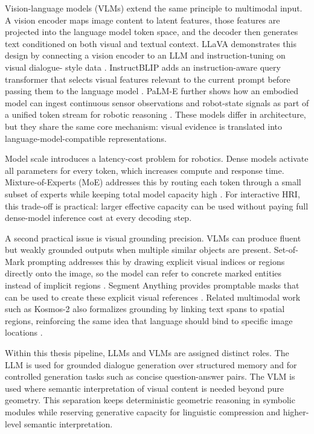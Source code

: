   Vision-language models (VLMs) extend the same principle to multimodal input. A vision encoder maps image content to latent features, those features are projected into the language model token space,
  and the decoder then generates text conditioned on both visual and textual context. LLaVA demonstrates this design by connecting a vision encoder to an LLM and instruction-tuning on visual dialogue-
  style data \cite{liu_visual_2023}. InstructBLIP adds an instruction-aware query transformer that selects visual features relevant to the current prompt before passing them to the language model
  \cite{dai_instructblip_2023}. PaLM-E further shows how an embodied model can ingest continuous sensor observations and robot-state signals as part of a unified token stream for robotic reasoning
  \cite{driess_palm-e_2023}. These models differ in architecture, but they share the same core mechanism: visual evidence is translated into language-model-compatible representations.

  Model scale introduces a latency-cost problem for robotics. Dense models activate all parameters for every token, which increases compute and response time. Mixture-of-Experts (MoE) addresses this by
  routing each token through a small subset of experts while keeping total model capacity high \cite{shazeer2017outrageouslylargeneuralnetworks}. For interactive HRI, this trade-off is practical: larger
  effective capacity can be used without paying full dense-model inference cost at every decoding step.

  A second practical issue is visual grounding precision. VLMs can produce fluent but weakly grounded outputs when multiple similar objects are present. Set-of-Mark prompting addresses this by drawing
  explicit visual indices or regions directly onto the image, so the model can refer to concrete marked entities instead of implicit regions \cite{yang_set-of-mark_2023}. Segment Anything provides
  promptable masks that can be used to create these explicit visual references \cite{kirillov_segment_2023}. Related multimodal work such as Kosmos-2 also formalizes grounding by linking text spans to
  spatial regions, reinforcing the same idea that language should bind to specific image locations \cite{peng_kosmos-2_2023}.

  Within this thesis pipeline, LLMs and VLMs are assigned distinct roles. The LLM is used for grounded dialogue generation over structured memory and for controlled generation tasks such as concise
  question-answer pairs. The VLM is used where semantic interpretation of visual content is needed beyond pure geometry. This separation keeps deterministic geometric reasoning in symbolic modules while
  reserving generative capacity for linguistic compression and higher-level semantic interpretation.

